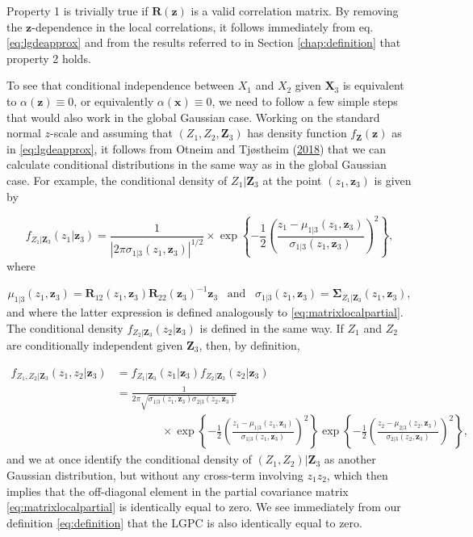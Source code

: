 \documentclass[
  12pt,
  letterpaper]{article}
\newcommand{\X}{\bm{X}}
\newcommand{\x}{\bm{x}}
\newcommand{\Z}{\bm{Z}}
\newcommand{\z}{\bm{z}}
\newcommand{\R}{\bm{R}}
\newcommand{\fSigma}{\bm{\Sigma}}
\theoremstyle{definition}
\theoremstyle{definition}
\theoremstyle{definition}
\theoremstyle{remark}
\begin{document}
Property 1 is trivially true if \(\R(\z)\) is a valid correlation matrix. By removing the \(\z\)-dependence in the local correlations, it follows immediately from eq. \eqref{eq:lgdeapprox} and from the results referred to in Section \ref{chap:definition} that property 2 holds.

To see that conditional independence between \(X_1\) and \(X_2\) given \(\X_3\) is equivalent to \(\alpha(\z) \equiv 0\), or equivalently \(\alpha(\x) \equiv 0\), we need to follow a few simple steps that would also work in the global Gaussian case. Working on the standard normal \(z\)-scale and assuming that \((Z_1, Z_2, \Z_3)\) has density function \(f_{\Z}(\z)\) as in \eqref{eq:lgdeapprox}, it follows from Otneim and Tjøstheim (\protect\hyperlink{ref-otneim2017conditional}{2018}) that we can calculate conditional distributions in the same way as in the global Gaussian case. For example, the conditional density of \(Z_1|\Z_3\) at the point \((z_1, \z_3)\) is given by

\[f_{Z_1|\Z_3}(z_1|\z_3) = \frac{1}{|2\pi\sigma_{1|3}(z_1, \z_3)|^{1/2}}\times\exp \left\{-\frac{1}{2}\left(\frac{z_1 - \mu_{1|3}(z_1, \z_3)}{\sigma_{1|3}(z_1, \z_3)}\right)^2\right\},\]
where

\begin{equation}
\mu_{1|3}(z_1, \z_3) = \R_{12}(z_1, \z_3)\R_{22}(\z_3)^{-1}\z_3 \,\,\, \textrm{ and } \,\,\, \sigma_{1|3}(z_1, \z_3) = \fSigma_{Z_1|\Z_3}(z_1,\z_3),
\label{eq:localconditionalpar}
\end{equation}
and where the latter expression is defined analogously to \eqref{eq:matrixlocalpartial}. The conditional density \(f_{Z_2|\Z_3}(z_2|\z_3)\) is defined in the same way. If \(Z_1\) and \(Z_2\) are conditionally independent given \(\Z_3\), then, by definition,

\begin{align*}
f_{Z_1,Z_2|\Z_3}(z_1, z_2|\z_3) &= f_{Z_1|\Z_3}(z_1|\z_3)f_{Z_2|\Z_3}(z_2|\z_3) \\
&= \frac{1}{2\pi\sqrt{\sigma_{1|3}(z_1, \z_3)\sigma_{2|3}(z_2, \z_3)}} \\ 
&\qquad \qquad \times\exp\left\{-\frac{1}{2}\left(\frac{z_1 - \mu_{1|3}(z_1, \z_3)}{\sigma_{1|3}(z_1, \z_3)}\right)^2\right\}\exp\left\{-\frac{1}{2}\left(\frac{z_2 - \mu_{2|3}(z_2, \z_3)}{\sigma_{2|3}(z_2, \z_3)}\right)^2\right\},
\end{align*}
and we at once identify the conditional density of \((Z_1,Z_2)|\Z_3\) as another Gaussian distribution, but without any cross-term involving \(z_1z_2\), which then implies that the off-diagonal element in the partial covariance matrix \eqref{eq:matrixlocalpartial} is identically equal to zero. We see immediately from our definition \eqref{eq:definition} that the LGPC is also identically equal to zero.
\end{document}
